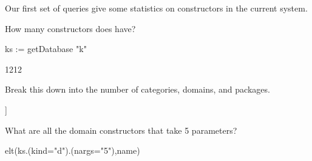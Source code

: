 {{{{{{{%

Our first set of queries give some statistics on constructors in
the current \Language{} system.

\begin{xtc}
\begin{xtccomment}
How many constructors does \Language{} have?
\end{xtccomment}
\begin{spadsrc}
ks := getDatabase "k"
\end{spadsrc}
\begin{TeXOutput}
\begin{fricasmath}{1}
1212%
\end{fricasmath}
\end{TeXOutput}
\end{xtc}
\begin{xtc}
\begin{xtccomment}
Break this down into the number of categories, domains, and packages.
\end{xtccomment}
\begin{spadsrc}
[ks.(kind=k) for k in ["c","d","p"]]
\end{spadsrc}
\begin{TeXOutput}
\begin{fricasmath}{2}
%
\end{fricasmath}
\end{TeXOutput}
\end{xtc}
\begin{xtc}
\begin{xtccomment}
What are all the domain constructors that take 5 parameters?
\end{xtccomment}
\begin{spadsrc}
elt(ks.(kind="d").(nargs="5"),name)
\end{spadsrc}
\begin{TeXOutput}
\begin{fricasmath}{3}
%
\end{fricasmath}

\end{TeXOutput}
\end{xtc}}}}}}}}

